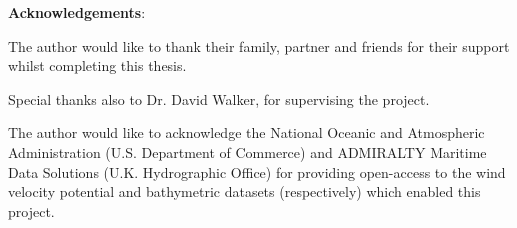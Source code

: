 \documentclass[preprint,12pt,authoryear]{elsarticle}
\begin{document}
\begin{frontmatter}
\clearpage

\textbf{Acknowledgements}:

The author would like to thank their family, partner and friends for their support whilst completing this thesis. 

Special thanks also to Dr. David Walker, for supervising the project.

The author would like to acknowledge the National Oceanic and Atmospheric Administration (U.S. Department of Commerce) and ADMIRALTY Maritime Data Solutions (U.K. Hydrographic Office) for providing open-access to the wind velocity potential and bathymetric datasets (respectively) which enabled this project.

\clearpage

\end{frontmatter}


\section{}
\label{}



 


\end{document}
